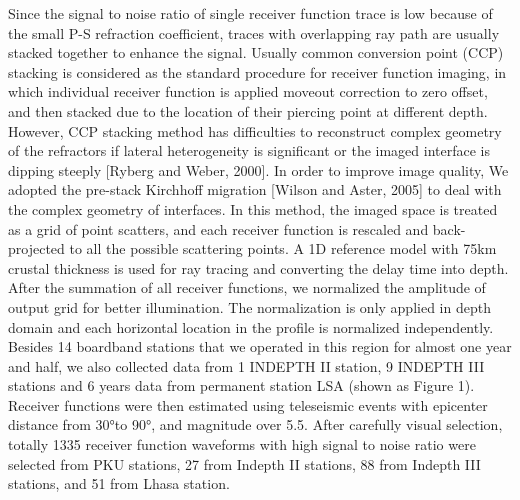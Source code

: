 Since the signal to noise ratio of single receiver function trace is low because of the small P-S refraction coefficient, traces with overlapping ray path are usually stacked together to enhance the signal. Usually common conversion point (CCP) stacking is considered as the standard procedure for receiver function imaging, in which individual receiver function is applied moveout correction to zero offset, and then stacked due to the location of their piercing point at different depth. However, CCP stacking method has difficulties to reconstruct complex geometry of the refractors if lateral heterogeneity is significant or the imaged interface is dipping steeply [Ryberg and Weber, 2000]. In order to improve image quality, We adopted the pre-stack Kirchhoff migration [Wilson and Aster, 2005] to deal with the complex geometry of interfaces. In this method, the imaged space is treated as a grid of point scatters, and each receiver function is rescaled and back-projected to all the possible scattering points. A 1D reference model with 75km crustal thickness is used for ray tracing and converting the delay time into depth. After the summation of all receiver functions, we normalized the amplitude of output grid for better illumination. The normalization is only applied in depth domain and each horizontal location in the profile is normalized independently. 
Besides 14 boardband stations that we operated in this region for almost one year and half, we also collected data from 1 INDEPTH II station, 9 INDEPTH III stations and 6 years data from permanent station LSA (shown as Figure 1). Receiver functions were then estimated using teleseismic events with epicenter distance from 30°to 90°, and magnitude over 5.5. After carefully visual selection, totally 1335 receiver function waveforms with high signal to noise ratio were selected from PKU stations, 27 from Indepth II stations, 88 from Indepth III stations, and 51 from Lhasa station.
